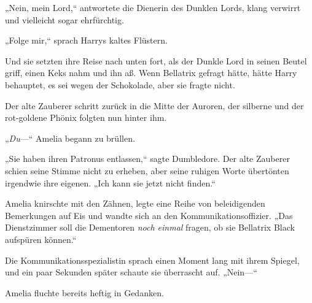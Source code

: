 „Nein, mein Lord,“ antwortete die Dienerin des Dunklen Lords, klang verwirrt und vielleicht sogar ehrfürchtig.

„Folge mir,“ sprach Harrys kaltes Flüstern.

Und sie setzten ihre Reise nach unten fort, als der Dunkle Lord in seinen Beutel griff, einen Keks nahm und ihn aß. Wenn Bellatrix gefragt hätte, hätte Harry behauptet, es sei wegen der Schokolade, aber sie fragte nicht.

\later

Der alte Zauberer schritt zurück in die Mitte der Auroren, der silberne und der rot-goldene Phönix folgten nun hinter ihm.

„\emph{Du}—“ Amelia begann zu brüllen.

„Sie haben ihren Patronus entlassen,“ sagte Dumbledore. Der alte Zauberer schien seine Stimme nicht zu erheben, aber seine ruhigen Worte übertönten irgendwie ihre eigenen. „Ich kann sie jetzt nicht finden.“

Amelia knirschte mit den Zähnen, legte eine Reihe von beleidigenden Bemerkungen auf Eis und wandte sich an den Kommunikationsoffizier. „Das Dienstzimmer soll die Dementoren \emph{noch einmal} fragen, ob sie Bellatrix Black aufspüren können.“

Die Kommunikationsspezialistin sprach einen Moment lang mit ihrem Spiegel, und ein paar Sekunden später schaute sie überrascht auf. „Nein—“

Amelia fluchte bereits heftig in Gedanken.

